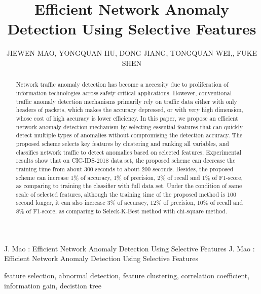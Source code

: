 \documentclass{ieeeaccess}
\theoremstyle{definition}
\begin{document}

\title{Efficient Network Anomaly Detection Using Selective Features}
\author{
    \uppercase{Jiewen Mao},
    \uppercase{Yongquan Hu},
    \uppercase{Dong Jiang},
    \uppercase{Tongquan Wei},, \uppercase{Fuke Shen}}
\address{School of Computer Science and Technology, East China Normal University, Shanghai 200062, China}

\markboth
{J. Mao \headeretal: Efficient Network Anomaly Detection Using Selective Features}
{J. Mao \headeretal: Efficient Network Anomaly Detection Using Selective Features}


\begin{abstract}
    Network traffic anomaly detection has become a necessity due to proliferation of information technologies across safety critical applications. 
    However, conventional traffic anomaly detection mechanisms primarily rely on traffic data either with only headers of packets, which makes the accuracy depressed, or with very high dimension, whose cost of high accuracy is lower efficiency. 
    In this paper, we propose an efficient network anomaly detection mechanism by selecting essential features that can quickly detect multiple types of anomalies without compromising the detection accuracy.
    The proposed scheme selects key features by clustering and ranking all variables, and classifies network traffic to detect anomalies based on selected features.
    Experimental results show that on CIC-IDS-2018 data set, the proposed scheme can decrease the training time from about 300 seconds to about 200 seconds. Besides, the proposed scheme can increase 1\% of accuracy, 1\% of precision, 2\% of recall and 1\% of F1-score, as comparing to training the classifier with full data set. 
    Under the condition of same scale of selected features, although the training time of the proposed method is 100 second longer, it can also increase 3\% of accuracy, 12\% of precision, 10\% of recall and 8\% of F1-score, as comparing to Seleck-K-Best method with chi-square method.
\end{abstract}

\begin{keywords}
    feature selection, abnormal detection, feature clustering, correlation coefficient, information gain, decistion tree
\end{keywords}
\end{document}
